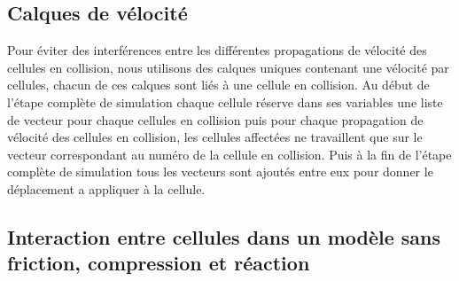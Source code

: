 \documentclass[a4paper,10pt]{article}
\begin{document}
\subsection{Calques de vélocité}

Pour éviter des interférences entre les différentes propagations de vélocité des cellules en collision, nous utilisons des calques uniques contenant une vélocité par cellules, chacun de ces calques sont liés à une cellule en collision. Au début de l'étape complète de simulation chaque cellule réserve dans ses variables une liste de vecteur pour chaque cellules en collision puis pour chaque propagation de vélocité des cellules en collision, les cellules affectées ne travaillent que sur le vecteur correspondant au numéro de la cellule en collision. Puis à la fin de l'étape complète de simulation tous les vecteurs sont ajoutés entre eux pour donner le déplacement a appliquer à la cellule.

\subsection{Interaction entre cellules dans un modèle sans friction, compression et réaction}
\end{document}
